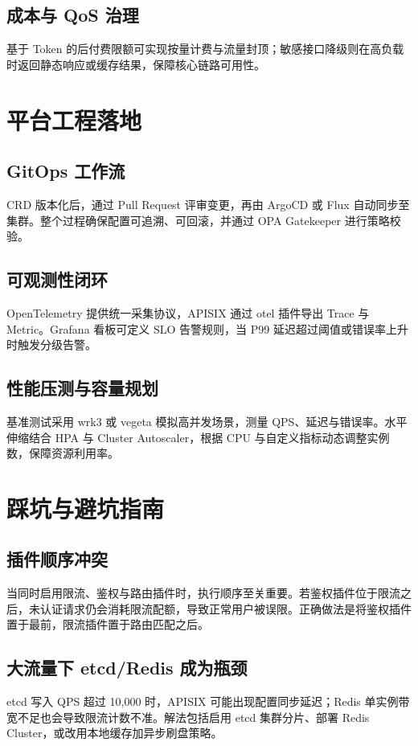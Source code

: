\section{成本与 QoS 治理}
基于 Token 的后付费限额可实现按量计费与流量封顶；敏感接口降级则在高负载时返回静态响应或缓存结果，保障核心链路可用性。\par
\chapter{平台工程落地}
\section{GitOps 工作流}
CRD 版本化后，通过 Pull Request 评审变更，再由 ArgoCD 或 Flux 自动同步至集群。整个过程确保配置可追溯、可回滚，并通过 OPA Gatekeeper 进行策略校验。\par
\section{可观测性闭环}
OpenTelemetry 提供统一采集协议，APISIX 通过 otel 插件导出 Trace 与 Metric。Grafana 看板可定义 SLO 告警规则，当 P99 延迟超过阈值或错误率上升时触发分级告警。\par
\section{性能压测与容量规划}
基准测试采用 wrk3 或 vegeta 模拟高并发场景，测量 QPS、延迟与错误率。水平伸缩结合 HPA 与 Cluster Autoscaler，根据 CPU 与自定义指标动态调整实例数，保障资源利用率。\par
\chapter{踩坑与避坑指南}
\section{插件顺序冲突}
当同时启用限流、鉴权与路由插件时，执行顺序至关重要。若鉴权插件位于限流之后，未认证请求仍会消耗限流配额，导致正常用户被误限。正确做法是将鉴权插件置于最前，限流插件置于路由匹配之后。\par
\section{大流量下 etcd/Redis 成为瓶颈}
etcd 写入 QPS 超过 10,000 时，APISIX 可能出现配置同步延迟；Redis 单实例带宽不足也会导致限流计数不准。解法包括启用 etcd 集群分片、部署 Redis Cluster，或改用本地缓存加异步刷盘策略。\par
